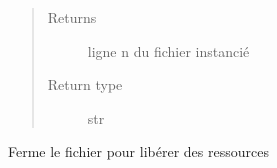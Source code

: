 \documentclass[letterpaper,10pt,english]{sphinxmanual}
\begin{document}
\begin{fulllineitems}
\begin{fulllineitems}
\begin{quote}
\begin{description}
\item[{Returns}] \leavevmode
ligne n du fichier instancié

\item[{Return type}] \leavevmode
str

\end{description}\end{quote}

\end{fulllineitems}


\begin{fulllineitems}
\label{loganalyser:loganalyser.fichier.Fichier.fermerfichier}
Ferme le fichier pour libérer des ressources

\end{fulllineitems}


\end{fulllineitems}

\end{document}
